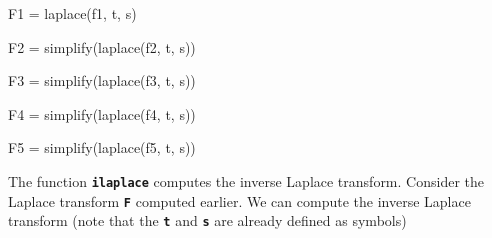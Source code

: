 \documentclass{article}
\begin{document}
\begin{matlabcode}
F1 = laplace(f1, t, s)
\end{matlabcode}
\begin{matlabcode}
F2 = simplify(laplace(f2, t, s))
\end{matlabcode}
\begin{matlabcode}
F3 = simplify(laplace(f3, t, s))
\end{matlabcode}
\begin{matlabcode}
F4 = simplify(laplace(f4, t, s))
\end{matlabcode}
\begin{matlabcode}
F5 = simplify(laplace(f5, t, s))
\end{matlabcode}



\begin{par}
\begin{flushleft}
The function \texttt{\textbf{ilaplace}} computes the inverse Laplace transform. Consider the Laplace transform \texttt{\textbf{F}} computed earlier. We can compute the inverse Laplace transform (note that the \texttt{\textbf{t}} and \texttt{\textbf{s}} are already defined as symbols)
\end{flushleft}
\end{par}
\end{document}
